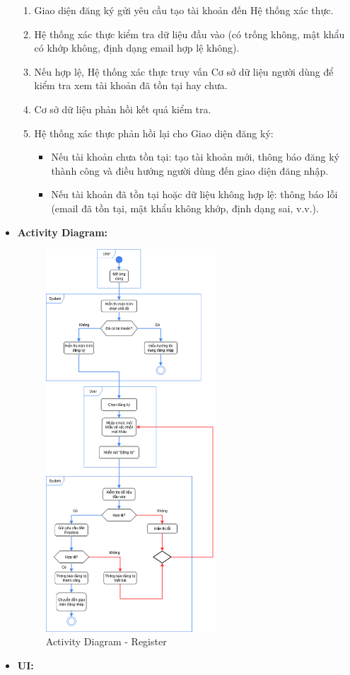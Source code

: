 \documentclass[a4paper]{article}
\begin{document}
\begin{itemize}
\begin{enumerate}
		      \item Giao diện đăng ký gửi yêu cầu tạo tài khoản đến Hệ thống xác thực.
		      \item Hệ thống xác thực kiểm tra dữ liệu đầu vào (có trống không, mật khẩu có khớp không, định dạng email hợp lệ không).
		      \item Nếu hợp lệ, Hệ thống xác thực truy vấn Cơ sở dữ liệu người dùng để kiểm tra xem tài khoản đã tồn tại hay chưa.
		      \item Cơ sở dữ liệu phản hồi kết quả kiểm tra.
		      \item Hệ thống xác thực phản hồi lại cho Giao diện đăng ký:
		            \begin{itemize}
			            \item Nếu tài khoản chưa tồn tại: tạo tài khoản mới, thông báo đăng ký thành công và điều hướng người dùng đến giao diện đăng nhập.
			            \item Nếu tài khoản đã tồn tại hoặc dữ liệu không hợp lệ: thông báo lỗi (email đã tồn tại, mật khẩu không khớp, định dạng sai, v.v.).
		            \end{itemize}
	      \end{enumerate}

	\item \textbf{Activity Diagram:}
	      \begin{figure}[H]
		      \centering
		      \includegraphics[width=0.6\textwidth]{Images/register_activity.png}
		      \caption{Activity Diagram - Register}
	      \end{figure}
	\item \textbf{UI:}



\end{itemize}
\end{document}

